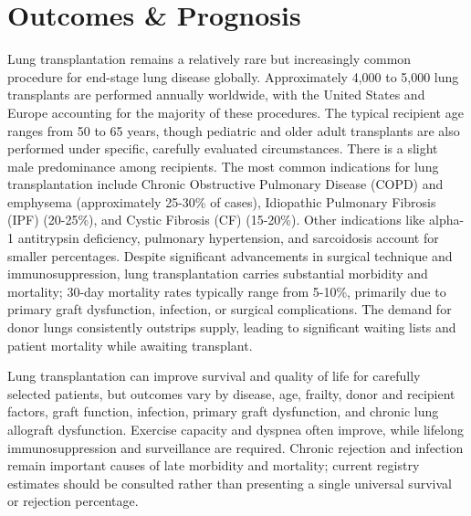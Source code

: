 \section*{Outcomes \& Prognosis}
Lung transplantation remains a relatively rare but increasingly common procedure for end-stage lung disease globally. Approximately 4,000 to 5,000 lung transplants are performed annually worldwide, with the United States and Europe accounting for the majority of these procedures. The typical recipient age ranges from 50 to 65 years, though pediatric and older adult transplants are also performed under specific, carefully evaluated circumstances. There is a slight male predominance among recipients. The most common indications for lung transplantation include Chronic Obstructive Pulmonary Disease (COPD) and emphysema (approximately 25-30\% of cases), Idiopathic Pulmonary Fibrosis (IPF) (20-25\%), and Cystic Fibrosis (CF) (15-20\%). Other indications like alpha-1 antitrypsin deficiency, pulmonary hypertension, and sarcoidosis account for smaller percentages. Despite significant advancements in surgical technique and immunosuppression, lung transplantation carries substantial morbidity and mortality; 30-day mortality rates typically range from 5-10\%, primarily due to primary graft dysfunction, infection, or surgical complications. The demand for donor lungs consistently outstrips supply, leading to significant waiting lists and patient mortality while awaiting transplant.

Lung transplantation can improve survival and quality of life for carefully selected patients, but outcomes vary by disease, age, frailty, donor and recipient factors, graft function, infection, primary graft dysfunction, and chronic lung allograft dysfunction. Exercise capacity and dyspnea often improve, while lifelong immunosuppression and surveillance are required. Chronic rejection and infection remain important causes of late morbidity and mortality; current registry estimates should be consulted rather than presenting a single universal survival or rejection percentage.

